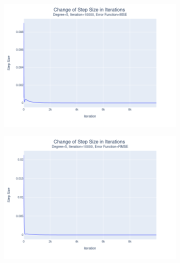 \documentclass[14pt,a4]{article}
\begin{document}
\begin{figure}[h]
\begin{subfigure}{0.3\textwidth}
        \includegraphics[width=\textwidth]{images/implementation/q1/part_d/step_size/5_10000_MSE.png}
    \end{subfigure}
    \hfill
    \begin{subfigure}{0.3\linewidth}
        \centering
        \includegraphics[width=\textwidth]{images/implementation/q1/part_d/step_size/5_10000_RMSE.png}
    \end{subfigure}
    \newline
    \begin{subfigure}{0.3\linewidth}
        \centering

\end{subfigure}
\end{figure}
\end{document}
